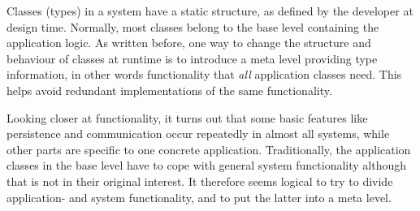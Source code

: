 Classes (types) in a system have a static structure, as defined by the developer
at design time. Normally, most classes belong to the base level containing the
application logic. As written before, one way to change the structure and
behaviour of classes at runtime is to introduce a meta level providing type
information, in other words functionality that \emph{all} application classes
need. This helps avoid redundant implementations of the same functionality.

Looking closer at functionality, it turns out that some basic features like
persistence and communication occur repeatedly in almost all systems, while
other parts are specific to one concrete application. Traditionally, the
application classes in the base level have to cope with general system
functionality although that is not in their original interest. It therefore
seems logical to try to divide application- and system functionality, and to put
the latter into a meta level.
